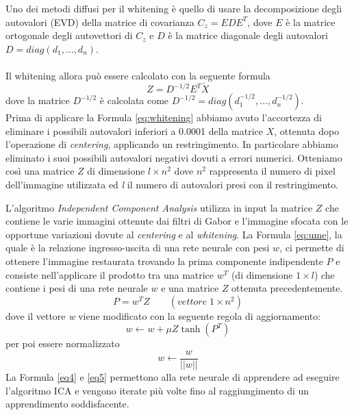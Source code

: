 \documentclass[final]{siamltex}
\begin{document}
Uno dei metodi diffusi per il whitening \`{e} quello di usare la decomposizione degli autovalori (EVD) della matrice di covarianza 
$ C_z = EDE^T $, dove $E$ \`{e} la matrice ortogonale degli autovettori di $C_z$ e $D$ \`{e} la matrice diagonale degli autovalori $D = diag(d_1, \dots, d_n)$.
\\
\\
Il whitening allora pu\`{o} essere calcolato con la seguente formula
\begin{equation}
\label{eq:whitening}
Z = D^{-1/2}E^T\check{X}
\end{equation}
dove la matrice $D^{-1/2}$ \`{e} calcolata come $D^{-1/2} = diag\left(d_1^{-1/2}, \dots , d_n^{-1/2}\right)$.
\\

Prima di applicare la Formula \eqref{eq:whitening} abbiamo avuto l'accortezza  di eliminare i possibili autovalori inferiori a 0.0001 della matrice $X$, ottenuta dopo l'operazione di \textit{centering},  applicando un restringimento. In particolare abbiamo eliminato i suoi possibili autovalori negativi dovuti a errori numerici. Otteniamo cos\`{i} una matrice $Z$ di dimensione $l \times n^2$ dove $n^2$ rappresenta il numero di pixel dell'immagine utilizzata ed \textit{l} il numero di autovalori presi con il restringimento.

L'algoritmo \textit{Independent Component Analysis} utilizza in input la matrice $Z$ che contiene le varie immagini ottenute dai filtri di Gabor e l'immagine sfocata con le opportune variazioni dovute al \textit{centering} e al \textit{whitening}. La Formula \eqref{eq:ume}, la quale \`{e} la relazione ingresso-uscita di una rete neurale con pesi $w$,  ci permette di ottenere l'immagine restaurata trovando la prima componente indipendente $P$ e consiste nell'applicare il prodotto tra una matrice $w^T$ (di dimensione $1 \times l$) che contiene i pesi di una rete neurale $w$ e una matrice $Z$ ottenuta precedentemente.
%
\begin{equation}
P = w^TZ \qquad(vettore\;1 \times n^2)
\label{eq:ume}
\end{equation}
%
dove il vettore \textit{w} viene modificato con la seguente regola di aggiornamento:
%
\begin{equation}
\label{eq4}
w \leftarrow w+\mu Z\tanh(P^T) 
\end{equation}
%
per poi essere normalizzato
%
\begin{equation}
\label{eq5}
w \leftarrow \frac{w}{||w||}
\end{equation}
%
La Formula \eqref{eq4} e \eqref{eq5} permettono alla rete neurale di apprendere ad eseguire l'algoritmo ICA e vengono iterate pi\`{u} volte fino al raggiungimento di un apprendimento soddisfacente.
 
\end{document}
